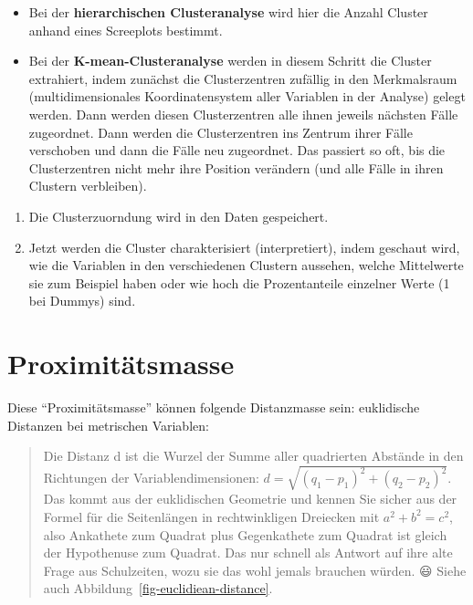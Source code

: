 \documentclass[
  10pt,
  letterpaper,
  a4paper, twoside]{scrreprt}
\providecommand{\tightlist}{%
  \setlength{\itemsep}{0pt}\setlength{\parskip}{0pt}}\usepackage{longtable,booktabs,array}
\begin{document}
\begin{itemize}
\tightlist
\item
  Bei der \textbf{hierarchischen Clusteranalyse} wird hier die Anzahl
  Cluster anhand eines Screeplots bestimmt.
\item
  Bei der \textbf{K-mean-Clusteranalyse} werden in diesem Schritt die
  Cluster extrahiert, indem zunächst die Clusterzentren zufällig in den
  Merkmalsraum (multidimensionales Koordinatensystem aller Variablen in
  der Analyse) gelegt werden. Dann werden diesen Clusterzentren alle
  ihnen jeweils nächsten Fälle zugeordnet. Dann werden die
  Clusterzentren ins Zentrum ihrer Fälle verschoben und dann die Fälle
  neu zugeordnet. Das passiert so oft, bis die Clusterzentren nicht mehr
  ihre Position verändern (und alle Fälle in ihren Clustern verbleiben).
\end{itemize}

\begin{enumerate}
\def\labelenumi{\arabic{enumi}.}
\setcounter{enumi}{5}
\item
  Die Clusterzuorndung wird in den Daten gespeichert.
\item
  Jetzt werden die Cluster charakterisiert (interpretiert), indem
  geschaut wird, wie die Variablen in den verschiedenen Clustern
  aussehen, welche Mittelwerte sie zum Beispiel haben oder wie hoch die
  Prozentanteile einzelner Werte (1 bei Dummys) sind.
\end{enumerate}

\section{Proximitätsmasse}\label{proximituxe4tsmasse}

Diese \enquote{Proximitätsmasse} können folgende Distanzmasse sein:
euklidische Distanzen bei metrischen Variablen:

\begin{quote}
Die Distanz d ist die Wurzel der Summe aller quadrierten Abstände in den
Richtungen der Variablendimensionen:
\(d = \sqrt{(q_1-p_1)^2 + (q_2-p_2)^2}\). Das kommt aus der euklidischen
Geometrie und kennen Sie sicher aus der Formel für die Seitenlängen in
rechtwinkligen Dreiecken mit \(a^2 + b^2 = c^2\), also Ankathete zum
Quadrat plus Gegenkathete zum Quadrat ist gleich der Hypothenuse zum
Quadrat. Das nur schnell als Antwort auf ihre alte Frage aus
Schulzeiten, wozu sie das wohl jemals brauchen würden. 😃 Siehe auch
Abbildung~\ref{fig-euclidiean-distance}.
\end{quote}
\end{document}
